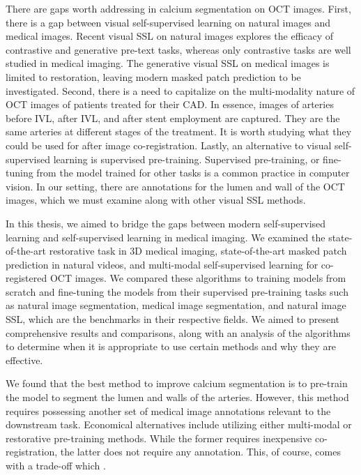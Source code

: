 \documentclass[a4paper,11pt,oneside]{report}
\begin{document}
There are gaps worth addressing in calcium segmentation on OCT images. First, there is a gap between visual self-supervised learning on natural images and medical images. Recent visual SSL on natural images explores the efficacy of contrastive and generative pre-text tasks, whereas only contrastive tasks are well studied in medical imaging. The generative visual SSL on medical images is limited to restoration, leaving modern masked patch prediction to be investigated. Second, there is a need to capitalize on the multi-modality nature of OCT images of patients treated for their CAD. In essence, images of arteries before IVL, after IVL, and after stent employment are captured. They are the same arteries at different stages of the treatment. It is worth studying what they could be used for after image co-registration. Lastly, an alternative to visual self-supervised learning is supervised pre-training. Supervised pre-training, or fine-tuning from the model trained for other tasks is a common practice in computer vision. In our setting, there are annotations for the lumen and wall of the OCT images, which we must examine along with other visual SSL methods.

In this thesis, we aimed to bridge the gaps between modern self-supervised learning and self-supervised learning in medical imaging. We examined the state-of-the-art restorative task in 3D medical imaging, state-of-the-art masked patch prediction in natural videos, and multi-modal self-supervised learning for co-registered OCT images. We compared these algorithms to training models from scratch and fine-tuning the models from their supervised pre-training tasks such as natural image segmentation, medical image segmentation, and natural image SSL, which are the benchmarks in their respective fields. We aimed to present comprehensive results and comparisons, along with an analysis of the algorithms to determine when it is appropriate to use certain methods and why they are effective.

We found that the best method to improve calcium segmentation is to pre-train the model to segment the lumen and walls of the arteries. However, this method requires possessing another set of medical image annotations relevant to the downstream task. Economical alternatives include utilizing either multi-modal or restorative pre-training methods. While the former requires inexpensive co-registration, the latter does not require any annotation. This, of course, comes with a trade-off which .%
\end{document}
